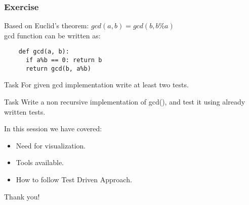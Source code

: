 \documentclass[compress,14pt]{beamer}
\newcounter{time}
\newcommand{\inctime}[1]{\addtocounter{time}{#1}{\vspace*{0.1in}\tiny \thetime\ m}}
\begin{document}
\begin{frame}[fragile]
    \frametitle{Exercise}
    Based on Euclid's theorem:
        $gcd(a,b)=gcd(b,b\%a)$\\
    gcd function can be written as:
    \begin{lstlisting}
    def gcd(a, b):
      if a%b == 0: return b
      return gcd(b, a%b)
    \end{lstlisting}
    \begin{block}{Task}
      For given gcd implementation write
      at least two tests.
    \end{block}
    \begin{block}{Task}
      Write a non recursive implementation
      of gcd(), and test it using already 
      written tests.
    \end{block}
    
\inctime{15} 
\end{frame}

\begin{frame}{In this session we have covered:}
  \begin{itemize}
    \item Need for visualization.
    \item Tools available.
    \item How to follow Test Driven Approach.
  \end{itemize}
\end{frame}
\begin{frame}
    \begin{center}
        \Huge    
        Thank you!
    \end{center}
\end{frame}
\end{document}
